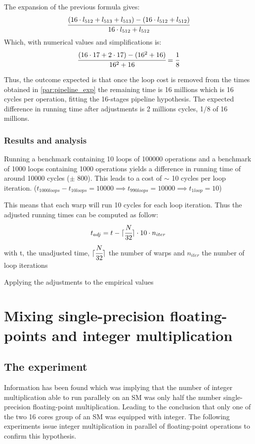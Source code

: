 \documentclass{article}
\DeclarePairedDelimiter\ceil{\lceil}{\rceil}
\begin{document}
    The expansion of the previous formula gives:
    \[ \cfrac{(16\cdot l_{512} + l_{513} + l_{513}) - (16\cdot l_{512} + l_{512})}{16\cdot l_{512} + l_{512}} \]
    Which, with numerical values and simplifications is:
    \[ \cfrac{(16\cdot 17 + 2\cdot 17) - (16^2 + 16)}{16^2 + 16} = \cfrac{1}{8}\] 

    Thus, the outcome expected is that once the loop cost is removed from the 
    times obtained in \ref{par:pipeline_exp} the remaining time is 16 millions
    which is 16 cycles per operation, fitting the 16-stages pipeline hypothesis.
    The expected difference in running time after adjustments is 2 millions cycles,
    1/8 of 16 millions.

	\subsubsection{Results and analysis}
    Running a benchmark containing 10 loops of 100000 operations and a benchmark
    of 1000 loops containing 1000 operations yields a difference in running time of
    around 10000 cycles ($\pm$ 800). This leads to a cost of $\sim$ 10 cycles per
    loop iteration. ($t_{1000loops} - t_{10loops} = 10000 \implies t_{990loops} = 10000
    \implies t_{1loop} = 10$)
    
	This means that each warp will run 10 cycles for each loop iteration. Thus the 
    adjusted running times can be computed as follow:
    \[ t_{adj} = t - \ceil{\cfrac{N}{32}}\cdot 10 \cdot n_{iter} \]
    with t, the unadjusted time, $\ceil{\cfrac{N}{32}}$ the number of warps and 
    $n_{iter}$ the number of loop iterations

    Applying the adjustments to the empirical values %

\section{Mixing single-precision floating-points and integer multiplication}
	\subsection{The experiment}
	Information has been found which was implying that the number of integer multiplication
    able to run parallely on an SM was only half the number single-precision floating-point
    multiplication. Leading to the conclusion that only one of the two 16 cores group of an
    SM was equipped with integer. The following experiments issue integer multiplication in
    parallel of floating-point operations to confirm this hypothesis.
\end{document}
